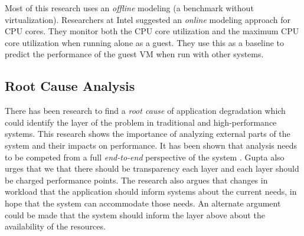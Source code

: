 Most of this research uses an \emph{offline} modeling (a benchmark without virtualization).  Researchers at Intel \cite{tickoo} suggested an \emph{online} modeling approach for CPU cores.  They monitor both the CPU core utilization and the maximum CPU core utilization when running alone as a guest.  They use this as a baseline to predict the performance of the guest VM when run with other systems.

\subsection{Root Cause Analysis}
There has been research to find a \emph{root cause} of application degradation which could identify the layer of the problem in traditional \cite{traeger} and high-performance \cite{knapp1} systems.  This research shows the importance of analyzing external parts of the system and their impacts on performance.  It has been shown that analysis needs to be competed from a full \emph{end-to-end} perspective of the system \cite{saltzer}.  Gupta \cite{gupta1} also urges that we that there should be transparency each layer and each layer should be charged performance points.  The research also argues that changes in workload that the application should inform systems about the current needs, in hope that the system can accommodate those needs.  An alternate argument could be made that the system should inform the layer above about the availability of the resources.  


